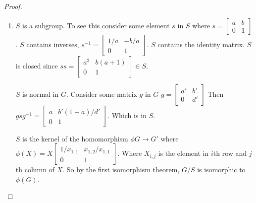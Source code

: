 \documentclass[12pt]{article}
\begin{document}
\begin{proof}
\begin{enumerate}
        \item $S$ is a subgroup. To see this consider some element $s$
            in $S$ where 
            $ s= 
                \left[
                    \begin{array}{cc}
                        a & b \\
                        0 & 1
                    \end{array}
                \right]$. 
            $S$ contains inverses, $s^{-1} =
                \left[
                    \begin{array}{cc}
                        1/a & -b/a \\
                        0   & 1
                    \end{array}
                \right]$. 
            $S$ contains the identity matrix. $S$ is closed since
            $ ss = 
                \left[
                    \begin{array}{cc}
                        a^2 & b(a + 1) \\
                        0 & 1
                    \end{array}
                \right] \in S$.

            $S$ is normal in $G$. Consider some matrix $g$ in $G$ 
            $g = \left[
            \begin{array}{cc}
                a' & b' \\
                0 & d'
            \end{array}
            \right]$
            Then $gsg^{-1} = \left[
            \begin{array}{cc}
                a & b'(1 - a)/d' \\
                0 & 1
            \end{array}
            \right]$. Which is in $S$.

            $S$ is the kernel of the homomorphism $\phi G \rightarrow G'$
            where $\phi(X) = X\left[
            \begin{array}{cc}
                1/x_{1,1} & x_{1,2}/x_{1,1} \\
                0 & 1
            \end{array}
            \right]$. Where $X_{i,j}$ is the element in $i$th row and
            $j$th column of $X$. So by the first isomorphism theorem,
            $G/S$ is isomorphic to $\phi(G)$.


\end{enumerate}
\end{proof}
\end{document}
